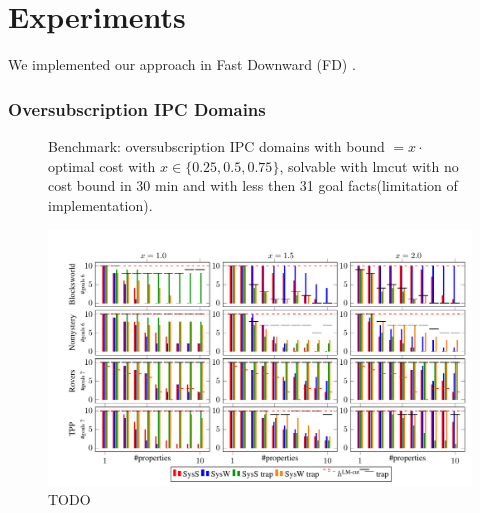 


\newcommand{\scatterplotsize}{8cm}
\newcommand{\scatterplotxlabelshift}{1.5ex}
\newcommand{\scatterplotylabelshift}{-3ex}

\section{Experiments}
\label{experiments}


We implemented our approach in Fast Downward (FD) \cite{helmert:jair-06}.  


\subsubsection*{Oversubscription IPC Domains}

\setlength{\tabcolsep}{2pt}
\renewcommand{\arraystretch}{0.8}
\begin{figure}[ht]
	\tiny
	\centering  
	\caption{
		Benchmark: oversubscription IPC
		domains with bound $ = x \cdot $ optimal cost with $
		x \in \{0.25, 0.5, 0.75\}$, solvable with lmcut with no cost bound in 
		30 min and with less then 31 goal facts(limitation of implementation).
	}
	\label{table:coverage_ipc}
\end{figure}

\begin{figure}[t]
\centering\centering
%
\includegraphics{data/action_set_properties/barchart/barchart.pdf}
\caption{TODO}
\label{fig:barcharts}
\end{figure}

